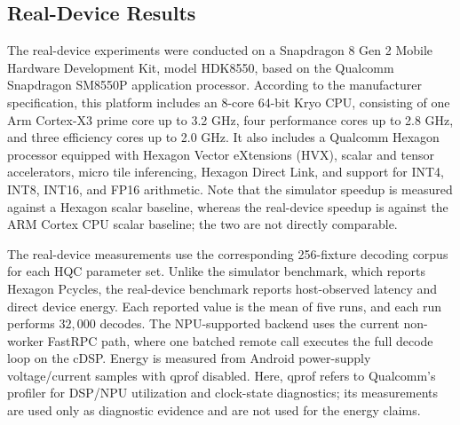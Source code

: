 \subsection{Real-Device Results}

The real-device experiments were conducted on a Snapdragon\textregistered{} 8 Gen 2 Mobile Hardware Development Kit, model HDK8550, based on the Qualcomm
Snapdragon SM8550P application processor. According to the manufacturer specification, this platform includes an 8-core 64-bit Kryo CPU, consisting of
one Arm Cortex-X3 prime core up to 3.2 GHz, four performance cores up to 2.8 GHz, and three efficiency cores up to 2.0 GHz. It also includes a Qualcomm
Hexagon processor equipped with Hexagon Vector eXtensions (HVX), scalar and tensor accelerators, micro tile inferencing, Hexagon Direct Link, and support
for INT4, INT8, INT16, and FP16 arithmetic. Note that the simulator speedup is measured against a Hexagon scalar baseline, whereas the real-device speedup is against the ARM Cortex CPU scalar baseline; the two are not directly comparable.

The real-device measurements use the corresponding 256-fixture decoding corpus for each HQC parameter set. Unlike the simulator benchmark, which reports
Hexagon Pcycles, the real-device benchmark reports host-observed latency and direct device energy. Each reported value is the mean of five runs, and
each run performs \(32{,}000\) decodes. The NPU-supported backend uses the current non-worker FastRPC path, where one batched remote call executes the
full decode loop on the cDSP. Energy is measured from Android power-supply voltage/current samples with qprof disabled. Here, qprof refers to Qualcomm's profiler for DSP/NPU
utilization and clock-state diagnostics; its measurements are used only as diagnostic evidence and are not used for the energy claims.

